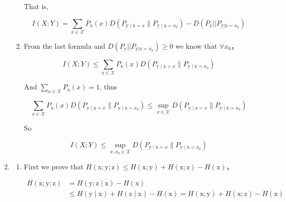 \documentclass[a4paper]{article}
\begin{document}
\begin{enumerate}
\begin{enumerate}
That is,

\begin{equation}
  I(X;Y) =   \sum_{x \in \mathcal{X}} P_{\mathrm{x}}(x) D\left(P_{\mathrm{y} \mid \mathrm{x}=x} \| P_{\mathrm{y} \mid \mathrm{x}=x_{0}}\right) -   D(P_\mathrm{y} || P_{\mathrm{y}|\mathrm{x}=x_0})
\end{equation}

\item 

From the last formula and $D(P_\mathrm{y} || P_{\mathrm{y}|\mathrm{x}=x_0}) \geqslant 0$ we know that $\forall x_0$，

\begin{equation}
  I(X;Y) \leqslant  \sum_{x \in \mathcal{X}} P_{\mathrm{x}}(x) D\left(P_{\mathrm{y} \mid \mathrm{x}=x} \| P_{\mathrm{y} \mid \mathrm{x}=x_{0}}\right) 
\end{equation}

And $\sum_{x \in \mathcal{X}} P_{\mathrm{x}}(x) = 1$, thus

\begin{equation}
  \sum_{x \in \mathcal{X}} P_{\mathrm{x}}(x) D\left(P_{\mathrm{y} \mid \mathrm{x}=x} \| P_{\mathrm{y} \mid \mathrm{x}=x_{0}}\right)  \leqslant \sup_{x\in \mathcal{X}} D\left(P_{\mathrm{y} \mid \mathrm{x}=x} \| P_{\mathrm{y} \mid \mathrm{x}=x_{0}}\right)  
\end{equation}

So 

\begin{equation}
  I(X;Y) \leqslant \sup_{x,x_0\in \mathcal{X}} D\left(P_{\mathrm{y} \mid \mathrm{x}=x} \| P_{\mathrm{y} \mid \mathrm{x}=x_{0}}\right)  
\end{equation}

\end{enumerate}

\item \begin{enumerate} %
  \item First we prove that $H(\mathrm{x};\mathrm{y};\mathrm{z}) \leqslant H(\mathrm{x};\mathrm{y}) + H(\mathrm{x};\mathrm{z}) - H(\mathrm{x})$，
  
  \begin{equation}
    \begin{aligned}
      H(\mathrm{x};\mathrm{y};\mathrm{z}) & = H(\mathrm{y};\mathrm{z} \mid \mathrm{x}) - H(\mathrm{x})\\ & \leqslant   H(\mathrm{y} \mid \mathrm{x})  + H(\mathrm{z} \mid \mathrm{x})- H(\mathrm{x}) = H(\mathrm{x};\mathrm{y}) + H(\mathrm{x};\mathrm{z})  - H(\mathrm{x})
    \end{aligned}
  \end{equation}


\end{enumerate}
\end{enumerate}
\end{document}
